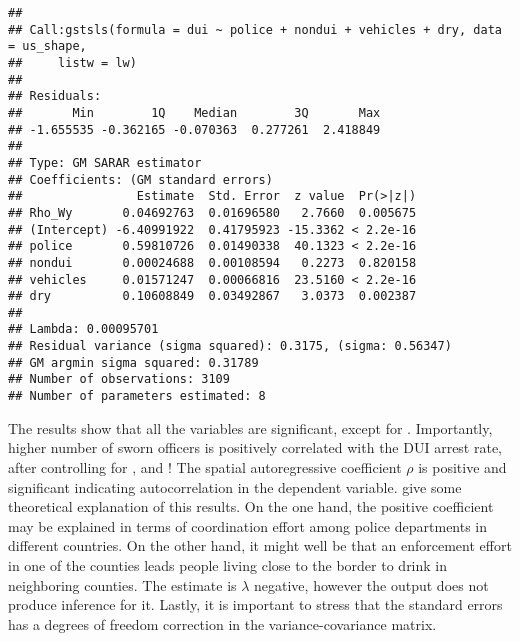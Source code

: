 \begin{knitrout}
\color{fgcolor}\begin{kframe}
\begin{alltt}
 \hlkwb{<-}  \hlopt{~}  \hlopt{+}  \hlopt{+}  \hlopt{+} 
                  
                  
\end{alltt}
\begin{verbatim}
## 
## Call:gstsls(formula = dui ~ police + nondui + vehicles + dry, data = us_shape, 
##     listw = lw)
## 
## Residuals:
##       Min        1Q    Median        3Q       Max 
## -1.655535 -0.362165 -0.070363  0.277261  2.418849 
## 
## Type: GM SARAR estimator
## Coefficients: (GM standard errors) 
##                Estimate  Std. Error  z value  Pr(>|z|)
## Rho_Wy       0.04692763  0.01696580   2.7660  0.005675
## (Intercept) -6.40991922  0.41795923 -15.3362 < 2.2e-16
## police       0.59810726  0.01490338  40.1323 < 2.2e-16
## nondui       0.00024688  0.00108594   0.2273  0.820158
## vehicles     0.01571247  0.00066816  23.5160 < 2.2e-16
## dry          0.10608849  0.03492867   3.0373  0.002387
## 
## Lambda: 0.00095701
## Residual variance (sigma squared): 0.3175, (sigma: 0.56347)
## GM argmin sigma squared: 0.31789
## Number of observations: 3109 
## Number of parameters estimated: 8
\end{verbatim}
\end{kframe}
\end{knitrout}

The results show that all the variables are significant, except for . Importantly, higher number of sworn officers is positively correlated with the DUI arrest rate, after controlling for ,  and ! The spatial autoregressive coefficient $\rho$ is positive and significant indicating autocorrelation in the dependent variable. \cite{drukker2011command} give some theoretical explanation of this results. On the one hand, the positive coefficient may be explained in terms of coordination effort among police departments in different countries. On the other hand, it might well be that an enforcement effort in one of the counties leads people living close to the border to drink in neighboring counties. The estimate is $\lambda$ negative, however the output does not produce inference for it. Lastly, it is important to stress that the standard errors has a degrees of freedom correction in the variance-covariance matrix. 

